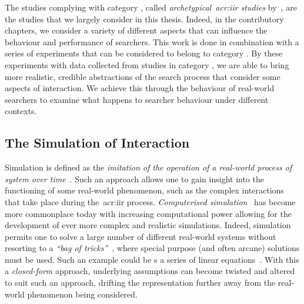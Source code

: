 The studies complying with category , called \emph{archetypical~\gls{acr:iir} studies} by~\cite{kelly2009iir}, are the studies that we largely consider in this thesis. Indeed, in the contributory chapters, we consider a variety of different aspects that can influence the behaviour and performance of searchers. This work is done in combination with a series of experiments that can be considered to belong to category . By  these experiments with data collected from studies in category , we are able to bring more realistic, credible abstractions of the search process that consider some aspects of interaction. We achieve this through  the behaviour of real-world searchers to examine what happens to searcher behaviour under different contexts.

\subsection{The Simulation of Interaction}\label{sec:ir_background:user:simulation}
Simulation is defined as the \emph{imitation of the operation of a real-world process of system over time}~\citep{banks1996discrete}. Such an approach allows one to gain insight into the functioning of some real-world phenomenon, such as the complex interactions that take place during the~\gls{acr:iir} process. \emph{Computerised simulation}~\citep{heermann1990computer_simulation} has become more commonplace today with increasing computational power allowing for the development of ever more complex and realistic simulations. Indeed, simulation permits one to solve a large number of different real-world systems without resorting to a \emph{``bag of tricks''}~\citep{fishwick1995simulation}, where special purpose (and often arcane) solutions must be used. Such an example could be s a series of linear equations~\citep{fishwick1995simulation}. With this a \emph{closed-form} approach, underlying assumptions can become twisted and altered to suit such an approach, drifting the representation further away from the real-world phenomenon being considered.


